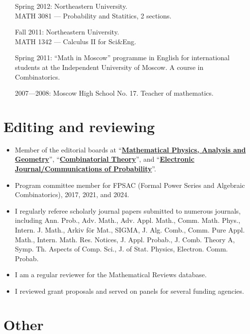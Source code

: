 \documentclass[letterpaper,11pt]{article}
\begin{document}
\begin{itemize}
	\item
	      [Spring 2012:]
	      Northeastern University. \\ MATH 3081 --- Probability and
	      Statitics, 2 sections.
	\item
	      [Fall 2011:]
	      Northeastern University.\\ MATH 1342 --- Calculus II for
	      Sci\&Eng.
	\item
	      [Spring 2011:]
	      ``Math in Moscow'' programme in English for international
	      students at the Independent University of Moscow. A course in
	      Combinatorics.

	\item
	      [2007---2008:]
	      Moscow High School No. 17. Teacher of mathematics.
\end{itemize}

\section*{Editing and reviewing}

\begin{itemize}
	\item
	Member of the editorial boards at ``\href{https://www.springer.com/journal/11040}{\textbf{Mathematical Physics, Analysis and Geometry}}'', ``\href{https://escholarship.org/uc/combinatorial_theory/}{\textbf{Combinatorial Theory}}'', and ``\href{https://imstat.org/journals-and-publications/electronic-journal-of-probability/}{\textbf{Electronic Journal/Communications of Probability}}''.
	\item Program committee member for FPSAC (Formal Power Series and Algebraic Combinatorics),
		2017, 2021, and 2024.
	\item
	I regularly referee scholarly journal papers submitted to numerous journals,
	including
	Ann. Prob., Adv. Math., Adv. Appl. Math., Comm. Math. Phys., Intern. J. Math.,
	Arkiv f\"or Mat., SIGMA, J. Alg. Comb., Comm. Pure Appl. Math., Intern. Math.
	Res. Notices, J. Appl. Probab., J. Comb. Theory A, Symp. Th. Aspects of Comp.
	Sci., J. of Stat. Physics, Electron. Comm. Probab.
	\item
	I am a regular
	reviewer for the Mathematical Reviews database.
	\item
	I reviewed grant proposals and served on panels for several funding agencies.
\end{itemize}

\section*{Other}
\end{document}
